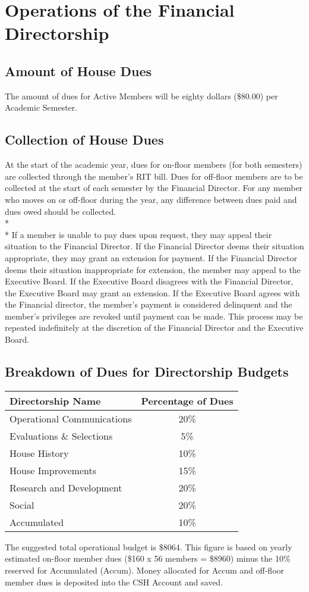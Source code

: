 \documentclass{article}
\newcommand{\bylaw}[1]{\section{#1} \label{#1}}
\newcommand{\bsection}[1]{\subsection{#1} \label{#1}}
\begin{document}
\bylaw{Operations of the Financial Directorship}
\bsection{Amount of House Dues}
The amount of dues for Active Members will be eighty dollars (\$80.00) per Academic Semester.
\bsection{Collection of House Dues}
At the start of the academic year, dues for on-floor members (for both semesters) are collected through the member’s RIT bill.
Dues for off-floor members are to be collected at the start of each semester by the Financial Director.
For any member who moves on or off-floor during the year, any difference between dues paid and dues owed should be collected.
\\*\\*
If a member is unable to pay dues upon request, they may appeal their situation to the Financial Director.
If the Financial Director deems their situation appropriate, they may grant an extension for payment.
If the Financial Director deems their situation inappropriate for extension, the member may appeal to the Executive Board.
If the Executive Board disagrees with the Financial Director, the Executive Board may grant an extension.
If the Executive Board agrees with the Financial director, the member’s payment is considered delinquent and the member’s privileges are revoked until payment can be made.
This process may be repeated indefinitely at the discretion of the Financial Director and the Executive Board.
\bsection{Breakdown of Dues for Directorship Budgets}
\begin{center}
\begin{tabular}[c]{l c}
Directorship Name & Percentage of Dues \\
\hline
\hline
Operational Communications & 20\% \\
\hline
Evaluations \& Selections & 5\% \\
\hline
House History & 10\% \\
\hline
House Improvements & 15\% \\
\hline
Research and Development & 20\% \\
\hline
Social & 20\% \\
\hline
Accumulated & 10\% \\
\hline
\end{tabular}
\end{center}

The suggested total operational budget is \$8064.
This figure is based on yearly estimated on-floor member dues (\$160 x 56 members = \$8960) minus the 10\% reserved for Accumulated (Accum).
Money allocated for Accum and off-floor member dues is deposited into the CSH Account and saved.
\end{document}

